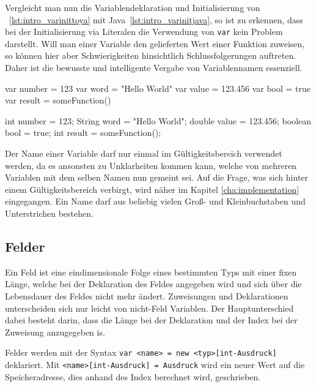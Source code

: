Vergleicht man nun die Variablendeklaration und Initialisierung von \toya~\ref{lst:intro_varinittoya} mit Java~\ref{lst:intro_varinitjava}, so ist zu erkennen, dass bei der Initialisierung via Literalen die Verwendung von \texttt{var} kein Problem darstellt. Will man einer Variable den gelieferten Wert einer Funktion zuweisen, so können hier aber Schwierigkeiten hinsichtlich Schlussfolgerungen auftreten. Daher ist die bewusste und intelligente Vergabe von Variablennamen essenziell.

\begin{ToyaCode}[numbers=none, caption={Variablendeklaration in toya}, label=lst:intro_varinittoya]
var number = 123
var word = "Hello World"
var value = 123.456
var bool = true
var result = someFunction()
\end{ToyaCode}

\begin{JavaCode}[numbers=none,caption={Variablendeklaration in Java (vor Version 10)}, label=lst:intro_varinitjava]
int number = 123;
String word = "Hello World";
double value = 123.456;
boolean bool = true;
int result = someFunction();
\end{JavaCode}

Der Name einer Variable darf nur einmal im Gültigkeitsbereich verwendet werden, da es ansonsten zu Unklarheiten kommen kann, welche von mehreren Variablen mit dem selben Namen nun gemeint sei. Auf die Frage, was sich hinter einem Gültigkeitsbereich verbirgt, wird näher im Kapitel \ref{cha:implementation} eingegangen. Ein Name darf aus beliebig vielen Groß- und Kleinbuchstaben und Unterstrichen bestehen.

\subsection{Felder}

Ein Feld ist eine eindimensionale Folge eines bestimmten Typs mit einer fixen Länge, welche bei der Deklaration des Feldes angegeben wird und sich über die Lebensdauer des Feldes nicht mehr ändert. Zuweisungen und Deklarationen unterscheiden sich nur leicht von nicht-Feld Variablen. Der Hauptunterschied dabei besteht darin, dass die Länge bei der Deklaration und der Index bei der Zuweisung anzugegeben is.

Felder werden mit der Syntax \texttt{var <name> = new <typ>[int-Ausdruck]} deklariert. Mit \texttt{<name>[int-Ausdruck] = Ausdruck} wird ein neuer Wert auf die Speicheradresse, dies anhand des Index berechnet wird, geschrieben.

